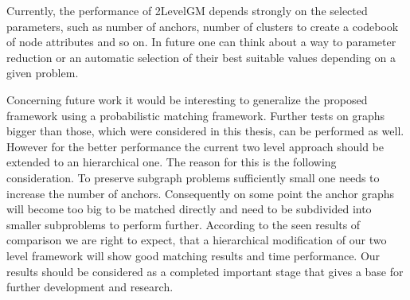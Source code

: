 Currently, the performance of 2LevelGM depends strongly on the selected parameters, such as number of anchors, number of clusters to create a codebook of node attributes and so on. In future one can think about a way to parameter reduction or an automatic selection of their best suitable values depending on a given problem.

Concerning future work it would be interesting to generalize the proposed framework using a probabilistic matching framework. Further tests on graphs bigger than those, which were considered in this thesis, can be performed as well. However for the better performance the current two level approach should be extended to an hierarchical one. The reason for this is the following consideration. To preserve subgraph problems sufficiently small one needs to increase the number of anchors. Consequently on some point the anchor graphs will become too big to be matched directly and need to be subdivided into smaller subproblems to perform further. According to the seen results of comparison we are right to expect, that a hierarchical modification of our two level framework will show good matching results and time performance. 
Our results should be considered as a completed important stage that gives a base for further development and research.

 
